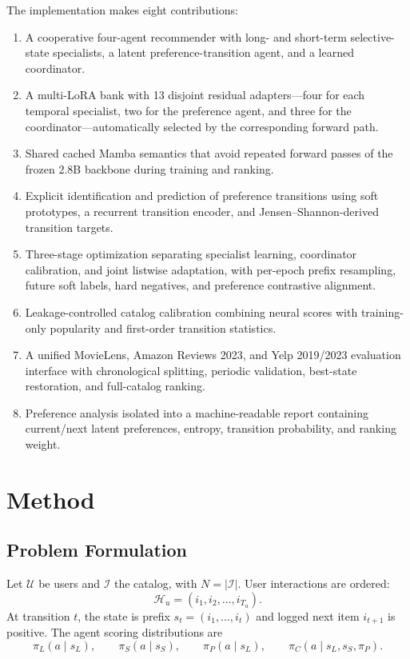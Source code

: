 \documentclass[11pt,a4paper]{article}
\begin{document}
The implementation makes eight contributions:
\begin{enumerate}
  \item A cooperative four-agent recommender with long- and short-term selective-state specialists, a latent preference-transition agent, and a learned coordinator.
  \item A multi-LoRA bank with 13 disjoint residual adapters---four for each temporal specialist, two for the preference agent, and three for the coordinator---automatically selected by the corresponding forward path.
  \item Shared cached Mamba semantics that avoid repeated forward passes of the frozen 2.8B backbone during training and ranking.
  \item Explicit identification and prediction of preference transitions using soft prototypes, a recurrent transition encoder, and Jensen--Shannon-derived transition targets.
  \item Three-stage optimization separating specialist learning, coordinator
  calibration, and joint listwise adaptation, with per-epoch prefix resampling,
  future soft labels, hard negatives, and preference contrastive alignment.
  \item Leakage-controlled catalog calibration combining neural scores with training-only popularity and first-order transition statistics.
  \item A unified MovieLens, Amazon Reviews 2023, and Yelp 2019/2023 evaluation interface with chronological splitting, periodic validation, best-state restoration, and full-catalog ranking.
  \item Preference analysis isolated into a machine-readable report containing current/next latent preferences, entropy, transition probability, and ranking weight.
\end{enumerate}



\section{Method}

\subsection{Problem Formulation}

Let $\mathcal U$ be users and $\mathcal I$ the catalog, with $N=|\mathcal I|$. User interactions are ordered:
\begin{equation}
  \mathcal H_u=(i_1,i_2,\ldots,i_{T_u}).
\end{equation}
At transition $t$, the state is prefix $s_t=(i_1,\ldots,i_t)$ and logged next item $i_{t+1}$ is positive. The agent scoring distributions are
\begin{equation}
  \pi_L(a\mid s_L),\qquad
  \pi_S(a\mid s_S),\qquad
  \pi_P(a\mid s_L),\qquad
  \pi_C(a\mid s_L,s_S,\pi_P).
\end{equation}
\end{document}
